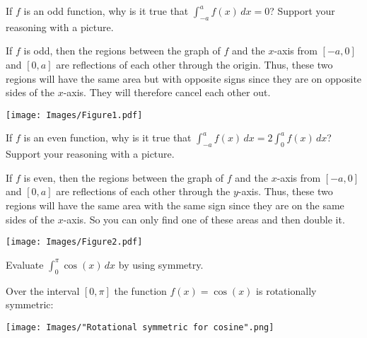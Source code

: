 \documentclass[handout, nooutcomes]{ximera}
\renewenvironment{freeResponse}{
\ifhandout\setbox0\vbox\bgroup\else
\begin{trivlist}\item[\hskip \labelsep\bfseries Solution:\hspace{2ex}]
\fi}
{\ifhandout\egroup\else
\end{trivlist}
\fi}
\renewcommand{\d}{\,d}
\begin{document}
\begin{problem}
  \mbox{}
  \begin{enumerate}
    \item[1.]
    If $f$ is an odd function, why is it true that $\int_{-a}^a f(x)
    \d x = 0$?  
    Support your reasoning with a picture.
    \begin{freeResponse}
      If $f$ is odd, then the regions between the graph of $f$ and the $x$-axis from $[-a,0]$ and $[0,a]$ are reflections of each other through the origin.
      Thus, these two regions will have the same area but with opposite signs since they are on opposite sides of the $x$-axis.
      They will therefore cancel each other out.
		
      \begin{image}
        \texttt{[image: Images/Figure1.pdf]}
      \end{image}
    \end{freeResponse}
		
    \item[2.]
      If $f$ is an even function, why is it true that $\int_{-a}^a f(x) \d x = 2 \int_0^a f(x) \d x$?
      Support your reasoning with a picture.
      \begin{freeResponse}
        If $f$ is even, then the regions between the graph of $f$ and the $x$-axis from $[-a,0]$ and $[0,a]$ are reflections of each other through the $y$-axis.
        Thus, these two regions will have the same area with the same sign since they are on the same sides of the $x$-axis.
        So you can only find one of these areas and then double it.
      \begin{image}
        \texttt{[image: Images/Figure2.pdf]}
      \end{image}
    \end{freeResponse}
	
    \item[3.]
      Evaluate $\int_0^{\pi} \cos(x) \d x$ by using symmetry.
      \begin{freeResponse}
        Over the interval $[0, \pi]$ the function $f(x) = \cos(x)$ is rotationally symmetric:
        \begin{image}
          \texttt{[image: Images/"Rotational symmetric for cosine".png]}
        \end{image}
      \end{freeResponse}
    \end{enumerate}
\end{problem}
\end{document}
